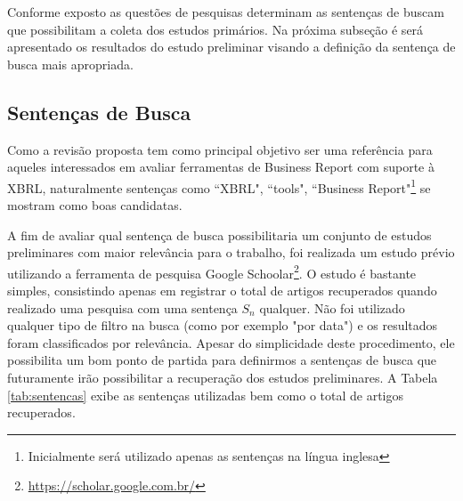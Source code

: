 \documentclass{article}
\begin{document}
Conforme exposto as questões de pesquisas determinam as sentenças de
buscam que possibilitam a coleta dos estudos primários. Na próxima
subseção é será apresentado os resultados do estudo preliminar visando
a definição da sentença de busca mais apropriada.

\subsection{Sentenças de Busca}
\label{subsec:setences}

Como a revisão proposta tem como principal objetivo ser uma referência para aqueles interessados em avaliar ferramentas de Business Report com suporte à XBRL, naturalmente sentenças como ``XBRL", ``tools", ``Business Report"\footnote{Inicialmente será utilizado apenas as sentenças na língua inglesa} se mostram como boas candidatas. 

A fim de avaliar qual sentença de busca possibilitaria um conjunto de
estudos preliminares com maior relevância para o trabalho, foi
realizada um estudo prévio utilizando a ferramenta de pesquisa Google
Schoolar\footnote{\url{https://scholar.google.com.br/}}. O estudo é
bastante simples, consistindo apenas em registrar o total de artigos
recuperados quando realizado uma pesquisa com uma sentença $S_n$
qualquer. Não foi utilizado qualquer tipo de filtro na busca (como por
exemplo "por data") e os resultados foram classificados por
relevância. Apesar do simplicidade deste procedimento, ele possibilita
um bom ponto de partida para definirmos a sentenças de busca que
futuramente irão possibilitar a recuperação dos estudos preliminares. 
A Tabela \ref{tab:sentencas} exibe as sentenças utilizadas bem como o total de artigos recuperados.
\begin{table}[]
\centering
{}
\caption{Total de artigos por sentença}
\label{tab:sentencas}
\end{table}
\end{document}
